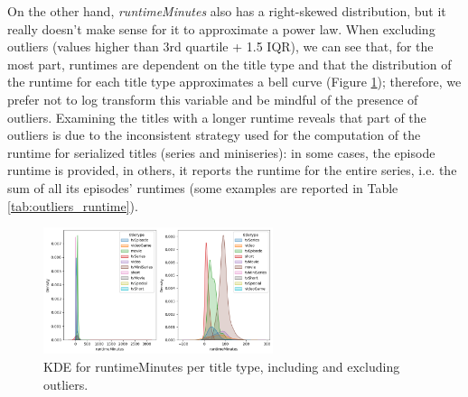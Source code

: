 On the other hand, \textit{runtimeMinutes} also has a right-skewed distribution, but it really doesn't make sense for it to approximate a power law. When excluding outliers (values higher than 3rd quartile + 1.5 IQR), we can see that, for the most part, runtimes are dependent on the title type and that the distribution of the runtime for each title type approximates a bell curve (Figure \ref{fig:kde_runtimeMinutes_doppio.png}); therefore, we prefer not to log transform this variable and be mindful of the presence of outliers. Examining the titles with a longer runtime reveals that part of the outliers is due to the inconsistent strategy used for the computation of the runtime for serialized titles (series and miniseries): in some cases, the episode runtime is provided, in others, it reports the runtime for the entire series, i.e. the sum of all its episodes' runtimes (some examples are reported in Table \ref{tab:outliers_runtime}).

\begin{figure}
    \centering
    \includegraphics[width=0.6\textwidth]{../results/images/kde_runtimeMinutes_doppio.png}
    \caption{KDE for runtimeMinutes per title type, including and excluding outliers.}
    \label{fig:kde_runtimeMinutes_doppio.png}
\end{figure}


\begin{table}[h]
    \centering
    \caption{Top 5 titles with the longest runtime.}
    \label{tab:outliers_runtime}
\end{table}


